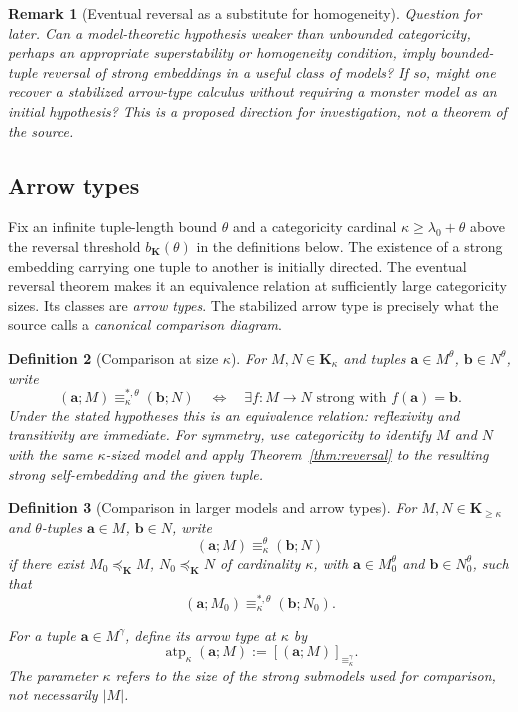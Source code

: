 \documentclass[11pt]{article}
\newcommand{\K}{\mathbf K}
\newcommand{\atp}{\operatorname{atp}}
\newcommand{\ba}{\mathbf{a}}
\newcommand{\bb}{\mathbf{b}}
\theoremstyle{plain}
\newtheorem{definition}{Definition}[section]
\newtheorem{remark}[definition]{Remark}
\begin{document}
\begin{remark}[Eventual reversal as a substitute for homogeneity]
\emph{Question for later.} Can a model-theoretic
hypothesis weaker than unbounded categoricity,
perhaps an appropriate superstability or homogeneity
condition, imply bounded-tuple reversal of strong
embeddings in a useful class of models? If so,
might one recover a stabilized arrow-type calculus
without requiring a monster model as an initial
hypothesis? This is a proposed direction for
investigation, not a theorem of the source.
\end{remark}


\subsection{Arrow types}\label{subsec:arrow}
Fix an infinite tuple-length bound $\theta$ and a categoricity
cardinal $\kappa\geq\lambda_0+\theta$ above the reversal
threshold $b_\K(\theta)$ in the definitions below.
The existence of a strong embedding carrying one tuple
to another is initially directed. The eventual reversal
theorem makes it an equivalence relation at sufficiently
large categoricity sizes. Its classes are \emph{arrow types}.
The stabilized arrow type is precisely what the source
calls a \emph{canonical comparison diagram}.

\begin{definition}[Comparison at size $\kappa$]
For $M,N\in\K_\kappa$ and tuples $\ba\in M^\theta$, $\bb\in N^\theta$, write
\[
(\ba;M)\equiv^{*,\theta}_\kappa(\bb;N)
\quad\Longleftrightarrow\quad
\exists f:M\longrightarrow N\text{ strong with }f(\ba)=\bb.
\]
Under the stated hypotheses this is an equivalence relation: reflexivity and transitivity are immediate. For symmetry, use categoricity to identify $M$ and $N$ with the same $\kappa$-sized model and apply Theorem~\ref{thm:reversal} to the resulting strong self-embedding and the given tuple.
\end{definition}

\begin{definition}[Comparison in larger models and arrow types]
For $M,N\in\K_{\geq\kappa}$ and $\theta$-tuples $\ba\in M$, $\bb\in N$, write
\[
(\ba;M)\equiv^\theta_\kappa(\bb;N)
\]
if there exist $M_0\preccurlyeq_\K M$, $N_0\preccurlyeq_\K N$ of cardinality $\kappa$, with $\ba\in M_0^\theta$ and $\bb\in N_0^\theta$, such that
\[
(\ba;M_0)\equiv^{*,\theta}_\kappa(\bb;N_0).
\]
\par
For a tuple $\ba\in M^\gamma$, define its
\emph{arrow type at $\kappa$} by
\[
\atp_\kappa(\ba;M):=[(\ba;M)]_{\equiv_\kappa^\gamma}.
\]
The parameter $\kappa$ refers to the size of the strong
submodels used for comparison, not necessarily $|M|$.
\end{definition}
\end{document}
